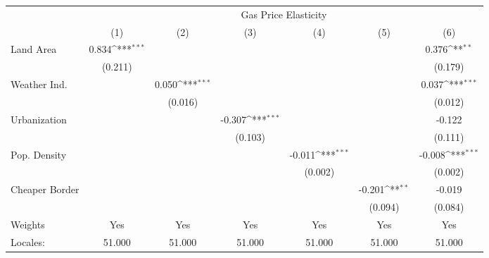 {
\def\sym#1{\ifmmode^{#1}\else\(^{#1}\)\fi}
\begin{tabular}{l*{6}{c}}
\hline\hline
            &\multicolumn{6}{c}{Gas Price Elasticity}                                                                                           \\
            &\multicolumn{1}{c}{(1)}         &\multicolumn{1}{c}{(2)}         &\multicolumn{1}{c}{(3)}         &\multicolumn{1}{c}{(4)}         &\multicolumn{1}{c}{(5)}         &\multicolumn{1}{c}{(6)}         \\
\hline
Land Area   &       0.834\sym{***}&                     &                     &                     &                     &       0.376\sym{**} \\
            &     (0.211)         &                     &                     &                     &                     &     (0.179)         \\
[1em]
Weather Ind.&                     &       0.050\sym{***}&                     &                     &                     &       0.037\sym{***}\\
            &                     &     (0.016)         &                     &                     &                     &     (0.012)         \\
[1em]
Urbanization&                     &                     &      -0.307\sym{***}&                     &                     &      -0.122         \\
            &                     &                     &     (0.103)         &                     &                     &     (0.111)         \\
[1em]
Pop. Density&                     &                     &                     &      -0.011\sym{***}&                     &      -0.008\sym{***}\\
            &                     &                     &                     &     (0.002)         &                     &     (0.002)         \\
[1em]
Cheaper Border&                     &                     &                     &                     &      -0.201\sym{**} &      -0.019         \\
            &                     &                     &                     &                     &     (0.094)         &     (0.084)         \\
\hline
Weights     &         Yes         &         Yes         &         Yes         &         Yes         &         Yes         &         Yes         \\
Locales:    &      51.000         &      51.000         &      51.000         &      51.000         &      51.000         &      51.000         \\
\hline\hline
\end{tabular}
}
